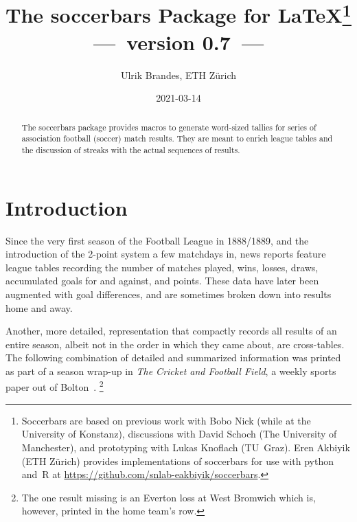 \documentclass[a4paper,12pt]{ltxdoc}
\title{The \textsf{soccerbars} Package for \LaTeX\thanks{%
Soccerbars are based on
previous work with Bobo Nick (while at the University of Konstanz),
discussions with David Schoch (The University of Manchester),
and prototyping with Lukas Knoflach (TU~Graz).
Eren Akbiyik (ETH Z\"urich) provides implementations of soccerbars
for use with python and~R at \url{https://github.com/snlab-eakbiyik/soccerbars}.}\\
\normalsize ---~version 0.7~---}
\author{Ulrik Brandes, ETH Zürich}
\date{2021-03-14}
\begin{document}
\maketitle
\begin{abstract}
The \textsf{soccerbars} package provides macros
to generate word-sized tallies
for series of association football (soccer) match results. 
They are meant to enrich league tables and the discussion of streaks
with the actual sequences of results.
\end{abstract}
\tableofcontents
\clearpage

\section{Introduction}

Since the very first season of the Football League in 1888/1889, 
and the introduction of the 2-point system a few matchdays in,
news reports feature league tables 
recording the number of matches played,
wins, losses, draws, accumulated goals for and against, and points.
These data have later been augmented with goal differences,
and are sometimes broken down into results home and away.

Another, more detailed, representation
that compactly records all results of an entire season,
albeit not in the order in which they came about,
are cross-tables.
The following combination of detailed and summarized information
was printed as part of a season wrap-up in
\emph{The Cricket and Football Field},
a weekly sports paper out of Bolton~\cite{fl1889}.%
\footnote{The one result missing is an Everton loss at West Bromwich
which is, however, printed in the home team's row.}
 
\end{document}

